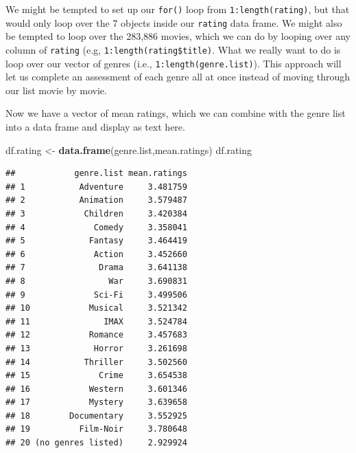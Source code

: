 \documentclass[]{book}
\newenvironment{Shaded}{\begin{snugshade}}{\end{snugshade}}
\newcommand{\KeywordTok}[1]{\textcolor[rgb]{0.13,0.29,0.53}{\textbf{{#1}}}}
\newcommand{\DecValTok}[1]{\textcolor[rgb]{0.00,0.00,0.81}{{#1}}}
\newcommand{\StringTok}[1]{\textcolor[rgb]{0.31,0.60,0.02}{{#1}}}
\newcommand{\CommentTok}[1]{\textcolor[rgb]{0.56,0.35,0.01}{\textit{{#1}}}}
\newcommand{\NormalTok}[1]{{#1}}
\begin{document}
We might be tempted to set up our \texttt{for()} loop from
\texttt{1:length(rating)}, but that would only loop over the 7 objects
inside our \texttt{rating} data frame. We might also be tempted to loop
over the 283,886 movies, which we can do by looping over any column of
\texttt{rating} (e.g, \texttt{1:length(rating\$title)}. What we really
want to do is loop over our vector of genres (i.e.,
\texttt{1:length(genre.list)}). This approach will let us complete an
assessment of each genre all at once instead of moving through our list
movie by movie.

\begin{Shaded}
\end{Shaded}

Now we have a vector of mean ratings, which we can combine with the
genre list into a data frame and display as text here.

\begin{Shaded}
\begin{Highlighting}[]
\NormalTok{df.rating <-}\StringTok{ }\KeywordTok{data.frame}\NormalTok{(genre.list,mean.ratings)}
\NormalTok{df.rating}
\end{Highlighting}
\end{Shaded}

\begin{verbatim}
##            genre.list mean.ratings
## 1           Adventure     3.481759
## 2           Animation     3.579487
## 3            Children     3.420384
## 4              Comedy     3.358041
## 5             Fantasy     3.464419
## 6              Action     3.452660
## 7               Drama     3.641138
## 8                 War     3.690831
## 9              Sci-Fi     3.499506
## 10            Musical     3.521342
## 11               IMAX     3.524784
## 12            Romance     3.457683
## 13             Horror     3.261698
## 14           Thriller     3.502560
## 15              Crime     3.654538
## 16            Western     3.601346
## 17            Mystery     3.639658
## 18        Documentary     3.552925
## 19          Film-Noir     3.780648
## 20 (no genres listed)     2.929924
\end{verbatim}
\end{document}
